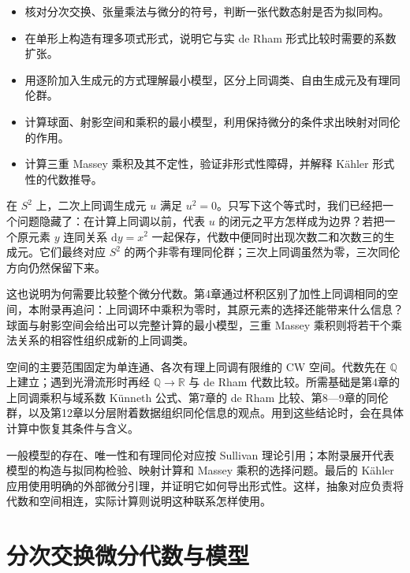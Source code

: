 \begin{learninggoals}
	\begin{itemize}
		\item 核对分次交换、张量乘法与微分的符号，判断一张代数态射是否为拟同构。
		\item 在单形上构造有理多项式形式，说明它与实 de Rham 形式比较时需要的系数扩张。
		\item 用逐阶加入生成元的方式理解最小模型，区分上同调类、自由生成元及有理同伦群。
		\item 计算球面、射影空间和乘积的最小模型，利用保持微分的条件求出映射对同伦的作用。
		\item 计算三重 Massey 乘积及其不定性，验证非形式性障碍，并解释 Kähler 形式性的代数推导。
	\end{itemize}
\end{learninggoals}

在 \(S^2\) 上，二次上同调生成元 \(u\) 满足 \(u^2=0\)。只写下这个等式时，我们已经把一个问题隐藏了：在计算上同调以前，代表 \(u\) 的闭元之平方怎样成为边界？若把一个原元素 \(y\) 连同关系 \(\mathrm dy=x^2\) 一起保存，代数中便同时出现次数二和次数三的生成元。它们最终对应 \(S^2\) 的两个非零有理同伦群；三次上同调虽然为零，三次同伦方向仍然保留下来。

\ProseParagraphBreak

这也说明为何需要比较整个微分代数。第4章通过杯积区别了加性上同调相同的空间，本附录再追问：上同调环中乘积为零时，其原元素的选择还能带来什么信息？球面与射影空间会给出可以完整计算的最小模型，三重 Massey 乘积则将若干个乘法关系的相容性组织成新的上同调类。

\ProseParagraphBreak

空间的主要范围固定为单连通、各次有理上同调有限维的 CW 空间。代数先在 \(\mathbb Q\) 上建立；遇到光滑流形时再经 \(\mathbb Q\to\mathbb R\) 与 de Rham 代数比较。所需基础是第4章的上同调乘积与域系数 Künneth 公式、第7章的 de Rham 比较、第8—9章的同伦群，以及第12章以分层附着数据组织同伦信息的观点。用到这些结论时，会在具体计算中恢复其条件与含义。

\ProseParagraphBreak

一般模型的存在、唯一性和有理同伦对应按 Sullivan 理论引用；本附录展开代表模型的构造与拟同构检验、映射计算和 Massey 乘积的选择问题。最后的 Kähler 应用使用明确的外部微分引理，并证明它如何导出形式性。这样，抽象对应负责将代数和空间相连，实际计算则说明这种联系怎样使用。

\section{分次交换微分代数与模型}
\label{g2:sec:E01}

